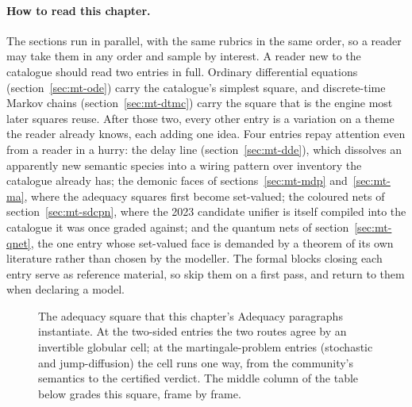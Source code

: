 \paragraph{How to read this chapter.} The sections run in parallel,
with the same rubrics in the same order, so a reader may take them in
any order and sample by interest. A reader new to the catalogue should
read two entries in full. Ordinary differential equations
(section~\ref{sec:mt-ode}) carry the catalogue's simplest square, and
discrete-time Markov chains (section~\ref{sec:mt-dtmc}) carry the
square that is the engine most later squares reuse. After those two, every
other entry is a variation on a theme the reader already knows, each
adding one idea. Four entries repay attention even from a reader in a
hurry: the delay line (section~\ref{sec:mt-dde}), which dissolves an
apparently new semantic species into a wiring pattern over inventory
the catalogue already has; the demonic faces of
sections~\ref{sec:mt-mdp} and~\ref{sec:mt-ma}, where the adequacy
squares first become set-valued; the coloured nets of
section~\ref{sec:mt-sdcpn}, where the 2023 candidate unifier is itself
compiled into the catalogue it was once graded against; and the
quantum nets of section~\ref{sec:mt-qnet}, the one entry whose
set-valued face is demanded by a theorem of its own literature rather
than chosen by the modeller. The formal
blocks closing each entry serve as reference material, so skip them on
a first pass, and return to them when declaring a model.

\begin{figure}[t]
\centering
{}
\caption{The adequacy square that this chapter's Adequacy
paragraphs instantiate. At the two-sided entries the two routes agree by an
invertible globular cell; at the martingale-problem entries
(stochastic and jump-diffusion) the cell runs one way, from the
community's semantics to the certified verdict. The middle column of
the table below grades this square, frame by frame.}
\label{fig:mt-adequacy-square}
\end{figure}

